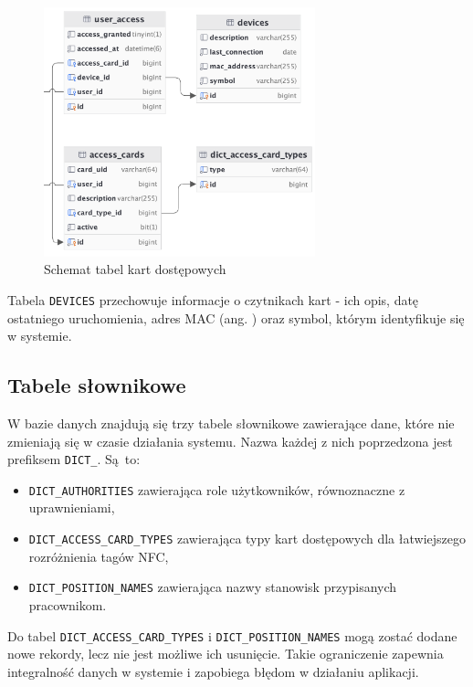 \begin{figure}[H]
    \centering
    \includegraphics[width=0.7\textwidth]{graf/acTable.png}
    \caption{Schemat tabel kart dostępowych}
    \label{fig:accessCardsTable}
\end{figure}

Tabela \texttt{DEVICES} przechowuje informacje o czytnikach kart - ich opis, datę ostatniego uruchomienia, adres MAC (ang. ) oraz symbol, którym identyfikuje się w systemie.

\subsection{Tabele słownikowe}

W bazie danych znajdują się trzy tabele słownikowe zawierające dane, które nie zmieniają się w czasie działania systemu. Nazwa każdej z nich poprzedzona jest prefiksem \texttt{DICT\_}. Są~to:
\begin{itemize}
    \item \texttt{DICT\_AUTHORITIES} zawierająca role użytkowników, równoznaczne z uprawnieniami,
    \item \texttt{DICT\_ACCESS\_CARD\_TYPES} zawierająca typy kart dostępowych dla łatwiejszego rozróżnienia tagów NFC,
    \item \texttt{DICT\_POSITION\_NAMES} zawierająca nazwy stanowisk przypisanych pracownikom.
\end{itemize}

Do tabel \texttt{DICT\_ACCESS\_CARD\_TYPES} i \texttt{DICT\_POSITION\_NAMES} mogą zostać dodane nowe rekordy, lecz nie jest możliwe ich usunięcie. Takie ograniczenie zapewnia integralność danych w systemie i zapobiega błędom w działaniu aplikacji.

